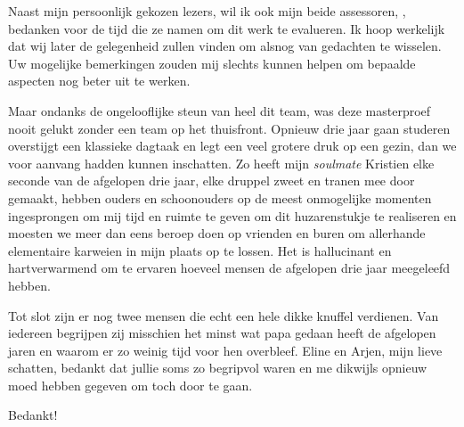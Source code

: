\begin{preface}
Naast mijn persoonlijk gekozen lezers, wil ik ook mijn beide assessoren, \TODO,
bedanken voor de tijd die ze namen om dit werk te evalueren. Ik hoop werkelijk
dat wij later de gelegenheid zullen vinden om alsnog van gedachten te wisselen.
Uw mogelijke bemerkingen zouden mij slechts kunnen helpen om bepaalde aspecten
nog beter uit te werken.

Maar ondanks de ongelooflijke steun van heel dit team, was deze masterproef
nooit gelukt zonder een team op het thuisfront. Opnieuw drie jaar gaan studeren
overstijgt een klassieke dagtaak en legt een veel grotere druk op een gezin,
dan we voor aanvang hadden kunnen inschatten. Zo heeft mijn \emph{soulmate}
Kristien elke seconde van de afgelopen drie jaar, elke druppel zweet en tranen
mee door gemaakt, hebben ouders en schoonouders op de meest onmogelijke
momenten ingesprongen om mij tijd en ruimte te geven om dit huzarenstukje te
realiseren en moesten we meer dan eens beroep doen op vrienden en buren om
allerhande elementaire karweien in mijn plaats op te lossen. Het is hallucinant
en hartverwarmend om te ervaren hoeveel mensen de afgelopen drie jaar
meegeleefd hebben.

Tot slot zijn er nog twee mensen die echt een hele dikke knuffel verdienen. Van
iedereen begrijpen zij misschien het minst wat papa gedaan heeft de afgelopen
jaren en waarom er zo weinig tijd voor hen overbleef. Eline en Arjen, mijn
lieve schatten, bedankt dat jullie soms zo begripvol waren en me dikwijls
opnieuw moed hebben gegeven om toch door te gaan.

\bigskip

Bedankt!

\end{preface}
